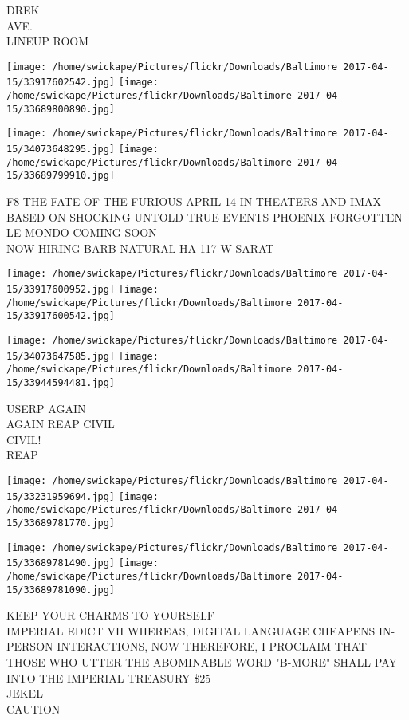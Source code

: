 \documentclass[10pt,letterpaper]{article}
\begin{document}
DREK\\
AVE.\\
LINEUP ROOM\\
\pagebreak

\texttt{[image: /home/swickape/Pictures/flickr/Downloads/Baltimore 2017-04-15/33917602542.jpg]}
\texttt{[image: /home/swickape/Pictures/flickr/Downloads/Baltimore 2017-04-15/33689800890.jpg]}

\texttt{[image: /home/swickape/Pictures/flickr/Downloads/Baltimore 2017-04-15/34073648295.jpg]}
\texttt{[image: /home/swickape/Pictures/flickr/Downloads/Baltimore 2017-04-15/33689799910.jpg]}

F8 THE FATE OF THE FURIOUS APRIL 14 IN THEATERS AND IMAX\\
BASED ON SHOCKING UNTOLD TRUE EVENTS PHOENIX FORGOTTEN\\
LE MONDO COMING SOON\\
NOW HIRING BARB NATURAL HA 117 W SARAT\\
\pagebreak

\texttt{[image: /home/swickape/Pictures/flickr/Downloads/Baltimore 2017-04-15/33917600952.jpg]}
\texttt{[image: /home/swickape/Pictures/flickr/Downloads/Baltimore 2017-04-15/33917600542.jpg]}

\texttt{[image: /home/swickape/Pictures/flickr/Downloads/Baltimore 2017-04-15/34073647585.jpg]}
\texttt{[image: /home/swickape/Pictures/flickr/Downloads/Baltimore 2017-04-15/33944594481.jpg]}

USERP AGAIN\\
AGAIN REAP CIVIL\\
CIVIL!\\
REAP\\
\pagebreak

\texttt{[image: /home/swickape/Pictures/flickr/Downloads/Baltimore 2017-04-15/33231959694.jpg]}
\texttt{[image: /home/swickape/Pictures/flickr/Downloads/Baltimore 2017-04-15/33689781770.jpg]}

\texttt{[image: /home/swickape/Pictures/flickr/Downloads/Baltimore 2017-04-15/33689781490.jpg]}
\texttt{[image: /home/swickape/Pictures/flickr/Downloads/Baltimore 2017-04-15/33689781090.jpg]}

KEEP YOUR CHARMS TO YOURSELF\\
IMPERIAL EDICT VII WHEREAS, DIGITAL LANGUAGE CHEAPENS IN{-}PERSON INTERACTIONS, NOW THEREFORE, I PROCLAIM THAT THOSE WHO UTTER THE ABOMINABLE WORD "B{-}MORE" SHALL PAY INTO THE IMPERIAL TREASURY \$25\\
JEKEL\\
CAUTION\\
\pagebreak
\end{document}

